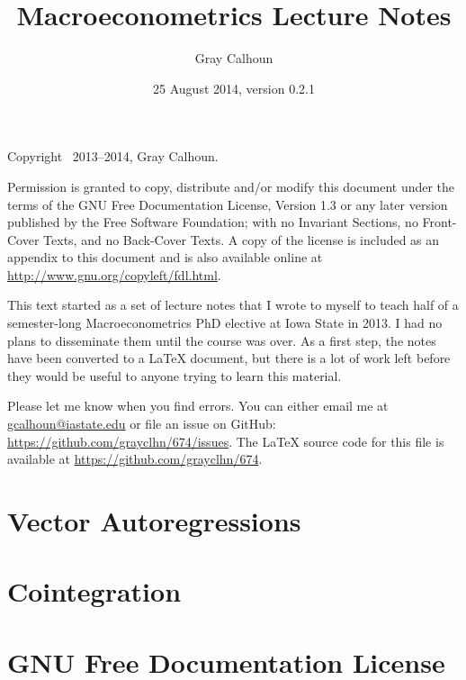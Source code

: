 \documentclass[12pt,notitlepage]{report}
\title{Macroeconometrics Lecture Notes}
\author{Gray Calhoun}
\date{25 August 2014, version 0.2.1}
\begin{document}
\maketitle

\bigskip\noindent%
Copyright \textcopyright\ 2013--2014, Gray Calhoun.

Permission is granted to copy, distribute and/or modify this document
under the terms of the GNU Free Documentation License, Version 1.3 or
any later version published by the Free Software Foundation; with no
Invariant Sections, no Front-Cover Texts, and no Back-Cover Texts.  A
copy of the license is included as an appendix to this document and is
also available online at \url{http://www.gnu.org/copyleft/fdl.html}.

This text started as a set of lecture notes that I
wrote to myself to teach half of a semester-long Macroeconometrics PhD
elective at Iowa State in 2013.  I had no plans to disseminate them
until the course was over.  As a first step, the notes have been
converted to a LaTeX document, but there is a lot of work left
before they would be useful to anyone trying to learn this material.

Please let me know when you find errors. You can either email me at
\url{gcalhoun@iastate.edu} or file an issue on GitHub:
\url{https://github.com/grayclhn/674/issues}. The LaTeX source code
for this file is available at \url{https://github.com/grayclhn/674}.

\tableofcontents
{}
\newpage

\chapter{Vector Autoregressions}





\chapter{Cointegration}




\chapter*{GNU Free Documentation License}



\end{document}
